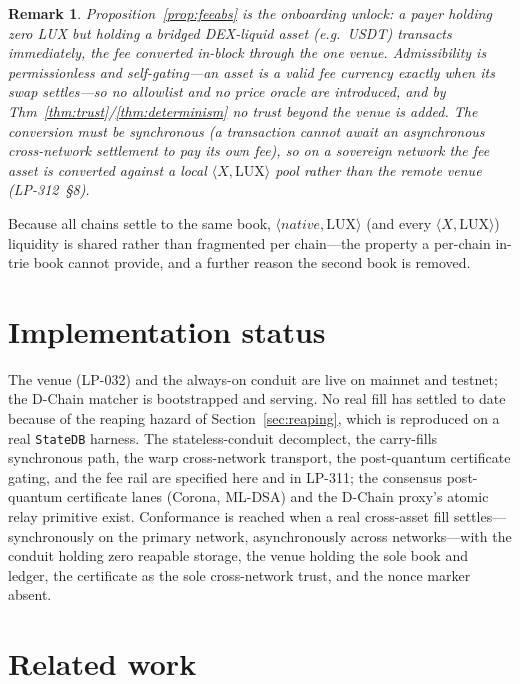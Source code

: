 \documentclass[11pt,a4paper]{article}
\newtheorem{remark}{Remark}[section]
\begin{document}
\begin{remark}
Proposition~\ref{prop:feeabs} is the onboarding unlock: a payer holding zero LUX but holding a
bridged DEX-liquid asset (e.g.\ USDT) transacts immediately, the fee converted in-block through the
one venue. Admissibility is permissionless and self-gating---an asset is a valid fee currency
exactly when its swap settles---so no allowlist and no price oracle are introduced, and by
Thm~\ref{thm:trust}/\ref{thm:determinism} no trust beyond the venue is added. The conversion must be
synchronous (a transaction cannot await an asynchronous cross-network settlement to pay its own
fee), so on a sovereign network the fee asset is converted against a local $\langle X,\mathrm{LUX}
\rangle$ pool rather than the remote venue (LP-312~\S8).
\end{remark}

Because all chains settle to the same book, $\langle \mathit{native}, \mathrm{LUX}\rangle$ (and every
$\langle X, \mathrm{LUX}\rangle$) liquidity is shared rather than fragmented per chain---the property
a per-chain in-trie book cannot provide, and a further reason the second book is removed.

\section{Implementation status}

The venue (LP-032) and the always-on conduit are live on mainnet and testnet; the D-Chain matcher
is bootstrapped and serving. No real fill has settled to date because of the reaping hazard of
Section~\ref{sec:reaping}, which is reproduced on a real \texttt{StateDB} harness. The
stateless-conduit decomplect, the carry-fills synchronous path, the warp cross-network transport,
the post-quantum certificate gating, and the fee rail are specified here and in LP-311; the
consensus post-quantum certificate lanes (Corona, ML-DSA) and the D-Chain proxy's atomic relay
primitive exist. Conformance is reached when a real cross-asset fill settles---synchronously on the
primary network, asynchronously across networks---with the conduit holding zero reapable storage,
the venue holding the sole book and ledger, the certificate as the sole cross-network trust, and the
nonce marker absent.

\section{Related work}
\end{document}
